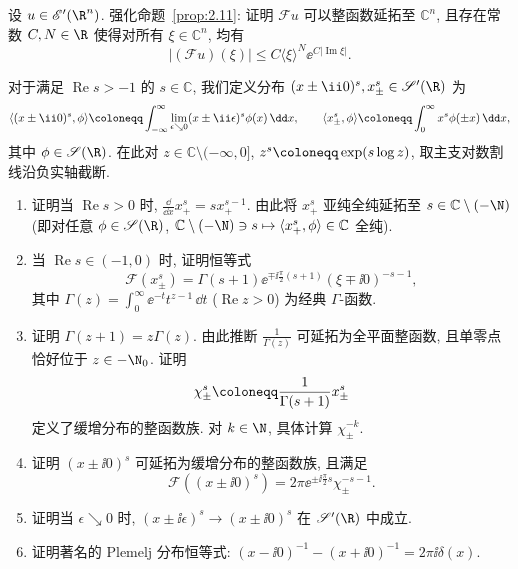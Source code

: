 \begin{exer}\label{ex:2.5}
设 $u \in \mathscr{E}'(\R^n)$. 强化命题~\ref{prop:2.11}: 证明 $\mathcal{F} u$ 可以整函数延拓至 $\mathbb{C}^n$, 且存在常数 $C, N \in \R$ 使得对所有 $\xi \in \mathbb{C}^n$, 均有
\[
    |(\mathcal{F} u)(\xi)| \le C \langle \xi \rangle^N \ee^{C |\!\operatorname{Im} \xi|}.
\]
\end{exer}

\begin{exer}[若干齐次分布]\label{ex:2.6}
对于满足 $\operatorname{Re} s > -1$ 的 $s \in \mathbb{C}$, 我们定义分布 $(x \pm \ii 0)^s, x_\pm^s \in \TempDistr(\R)$ 为
\begin{equation}\label{eq:2.69}
    \langle (x \pm \ii 0)^s, \phi \rangle \defeq \int_{-\infty}^\infty \lim_{\epsilon \searrow 0} (x \pm \ii \epsilon)^s \phi(x) \,\dd x, \qquad \langle x_\pm^s, \phi \rangle \defeq \int_0^\infty x^s \phi(\pm x) \,\dd x,
\end{equation}
其中 $\phi \in \Schwartz(\R)$. 在此对 $z \in \mathbb{C} \setminus (-\infty, 0]$, $z^s \defeq \exp(s \log z)$, 取主支对数割线沿负实轴截断.
\begin{enumerate}
    \item 证明当 $\operatorname{Re} s > 0$ 时, $\frac{\dd}{\dd x} x_+^s = s x_+^{s-1}$. 由此将 $x_+^s$ 亚纯全纯延拓至 $s \in \mathbb{C} \setminus (-\N)$ (即对任意 $\phi \in \Schwartz(\R)$, $\mathbb{C} \setminus (-\N) \ni s \mapsto \langle x_+^s, \phi \rangle \in \mathbb{C}$ 全纯).
    \item 当 $\operatorname{Re} s \in (-1, 0)$ 时, 证明恒等式
    \begin{equation}\label{eq:2.70}
        \mathcal{F}(x_\pm^s) = \Gamma(s + 1) \ee^{\mp \ii \frac{\pi}{2}(s+1)} (\xi \mp \ii 0)^{-s-1},
    \end{equation}
    其中 $\Gamma(z) = \int_0^\infty \ee^{-t} t^{z-1} \,\dd t$ ($\operatorname{Re} z > 0$) 为经典 $\Gamma$-函数.
    \item 证明 $\Gamma(z + 1) = z \Gamma(z)$. 由此推断 $\frac{1}{\Gamma(z)}$ 可延拓为全平面整函数, 且单零点恰好位于 $z \in -\N_0$. 证明
    \begin{equation}\label{eq:2.71}
        \chi_\pm^s \defeq \frac{1}{\Gamma(s+1)} x_\pm^s
    \end{equation}
    定义了缓增分布的整函数族. 对 $k \in \N$, 具体计算 $\chi_\pm^{-k}$.
    \item 证明 $(x \pm \ii 0)^s$ 可延拓为缓增分布的整函数族, 且满足
    \begin{equation}\label{eq:2.72}
        \mathcal{F}((x \pm \ii 0)^s) = 2\pi \ee^{\pm \ii \frac{\pi}{2} s} \chi_\pm^{-s-1}.
    \end{equation}
    \item 证明当 $\epsilon \searrow 0$ 时, $(x \pm \ii \epsilon)^s \to (x \pm \ii 0)^s$ 在 $\TempDistr(\R)$ 中成立.
    \item 证明著名的 Plemelj 分布恒等式: $(x - \ii 0)^{-1} - (x + \ii 0)^{-1} = 2\pi \ii \delta(x)$.
\end{enumerate}
\end{exer}

